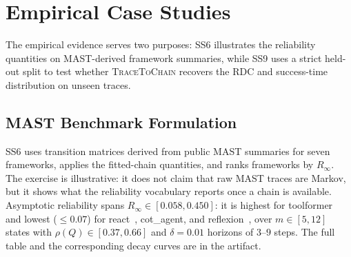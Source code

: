\section{Empirical Case Studies}
\label{sec:case_studies}

The empirical evidence serves two purposes: SS6 illustrates the
reliability quantities on MAST-derived framework summaries, while SS9
uses a strict held-out split to test whether \textsc{TraceToChain}
recovers the RDC and success-time distribution on unseen traces.

\subsection{MAST Benchmark Formulation}
\label{sec:mast}

SS6 uses transition matrices derived from public MAST summaries for
seven frameworks, applies the fitted-chain quantities, and ranks
frameworks by $R_\infty$. The exercise is illustrative: it does not
claim that raw MAST traces are Markov, but it shows what the reliability
vocabulary reports once a chain is available. Asymptotic reliability
spans $R_\infty\in[0.058,0.450]$: it is highest for
toolformer~\cite{schick2023toolformer} and lowest
($\le\!0.07$) for react~\cite{yao2023react}, cot\_agent, and
reflexion~\cite{shinn2023reflexion}, over
$m\in[5,12]$ states with $\rho(Q)\in[0.37,0.66]$ and $\delta{=}0.01$
horizons of $3$--$9$ steps. The full table and the corresponding decay
curves are in the artifact.

